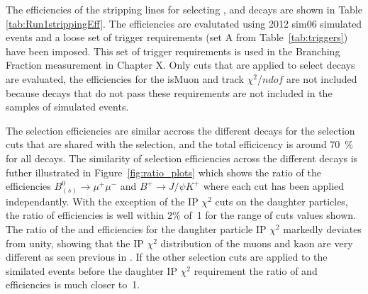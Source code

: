 The efficiencies of the stripping lines for selecting \bmumu, \bhh and \bujpsik decays are shown in Table \ref{tab:Run1strippingEff}. The efficiencies are evalutated using 2012 sim06 simulated events and a loose set of trigger requirements (set A from Table~\ref{tab:triggers}) have been imposed. This set of trigger requirements is used in the Branching Fraction measurement in Chapter X. Only cuts that are applied to select \bmumu decays are evaluated, the efficiencies for the isMuon and track $\chi^{2}$/$ndof$ are not included because decays that do not pass these requirements are not included in the samples of simulated events. 

The selection efficiencies are similar accross the different decays for the selection cuts that are shared with the \bmumu selection, and the total efficicency is around 70~$\%$ for all decays. The similarity of selection efficiencies across the different decays is futher illustrated in Figure~\ref{fig:ratio_plots} which shows the ratio of the efficiencies $B^{0}_{(s)}\to\mu^{+} \mu^{-}$ and $B^{+}\to J/\psi K^{+}$ where each cut has been applied independantly.  With the exception of the IP $\chi^{2}$ cuts on the daughter particles, the ratio of efficiencies is well within $2\%$ of~1 for the range of cuts values shown. The ratio of the \bsmumu and \bujpsik efficiencies for the daughter particle IP $\chi^{2}$ markedly deviates from unity, showing that the IP $\chi^{2}$ distribution of the muons and kaon are very different as seen previous in \cite{Diego}. If the other selection cuts are applied to the similated events before the daughter IP $\chi^{2}$ requirement the ratio of \bmumu and \bujpsik efficiencies is much closer to~1. 


